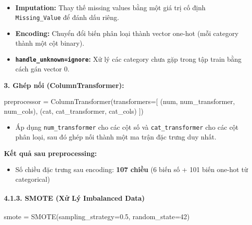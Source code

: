 \documentclass[
]{article}
\newenvironment{Shaded}{}{}
\newcommand{\DecValTok}[1]{\textcolor[rgb]{0.25,0.63,0.44}{#1}}
\newcommand{\FloatTok}[1]{\textcolor[rgb]{0.25,0.63,0.44}{#1}}
\newcommand{\NormalTok}[1]{#1}
\newcommand{\OperatorTok}[1]{\textcolor[rgb]{0.40,0.40,0.40}{#1}}
\newcommand{\StringTok}[1]{\textcolor[rgb]{0.25,0.44,0.63}{#1}}
\providecommand{\tightlist}{%
  \setlength{\itemsep}{0pt}\setlength{\parskip}{0pt}}
\begin{document}
\begin{itemize}
\tightlist
\item
  \textbf{Imputation:} Thay thế missing values bằng một giá trị cố định
  \texttt{\textquotesingle{}Missing\_Value\textquotesingle{}} để đánh
  dấu riêng.
\item
  \textbf{Encoding:} Chuyển đổi biến phân loại thành vector one-hot (mỗi
  category thành một cột binary).
\item
  \textbf{\texttt{handle\_unknown=\textquotesingle{}ignore\textquotesingle{}}:}
  Xử lý các category chưa gặp trong tập train bằng cách gán vector 0.
\end{itemize}

\textbf{3. Ghép nối (ColumnTransformer):}

\begin{Shaded}
\begin{Highlighting}[]
\NormalTok{preprocessor }\OperatorTok{=}\NormalTok{ ColumnTransformer(transformers}\OperatorTok{=}\NormalTok{[}
\NormalTok{    (}\StringTok{\textquotesingle{}num\textquotesingle{}}\NormalTok{, num\_transformer, num\_cols),}
\NormalTok{    (}\StringTok{\textquotesingle{}cat\textquotesingle{}}\NormalTok{, cat\_transformer, cat\_cols)}
\NormalTok{])}
\end{Highlighting}
\end{Shaded}

\begin{itemize}
\tightlist
\item
  Áp dụng \texttt{num\_transformer} cho các cột số và
  \texttt{cat\_transformer} cho các cột phân loại, sau đó ghép nối thành
  một ma trận đặc trưng duy nhất.
\end{itemize}

\textbf{Kết quả sau preprocessing:}

\begin{itemize}
\tightlist
\item
  Số chiều đặc trưng sau encoding: \textbf{107 chiều} (6 biến số + 101
  biến one-hot từ categorical)
\end{itemize}

\paragraph{4.1.3. SMOTE (Xử Lý Imbalanced
Data)}\label{413-smote-xux1eed-luxfd-imbalanced-data}

\begin{Shaded}
\begin{Highlighting}[]
\NormalTok{smote }\OperatorTok{=}\NormalTok{ SMOTE(sampling\_strategy}\OperatorTok{=}\FloatTok{0.5}\NormalTok{, random\_state}\OperatorTok{=}\DecValTok{42}\NormalTok{)}
\end{Highlighting}
\end{Shaded}
\end{document}
